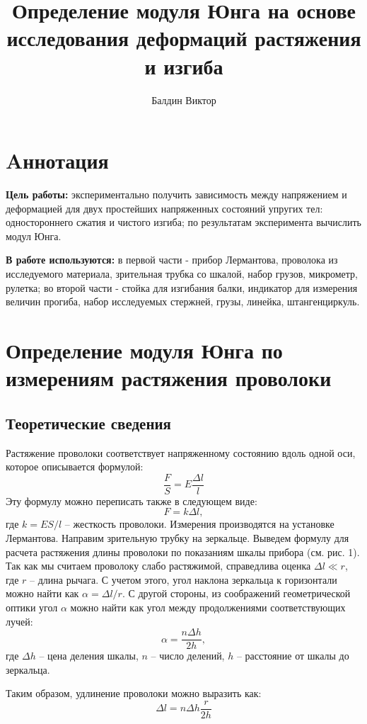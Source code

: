 \documentclass[12pt]{article}
\title{Определение модуля Юнга на основе исследования деформаций растяжения и изгиба}
\author{Балдин Виктор}
\begin{document}
    \maketitle

    \section{Aннотация}
    \par \textbf{Цель работы:} экспериментально получить зависимость между напряжением и деформацией
    для двух простейших напряженных состояний упругих тел: одностороннего сжатия и чистого изгиба;
    по результатам эксперимента вычислить модул Юнга.\\
    \par \textbf{В работе используются:} в первой части - прибор Лермантова, проволока
    из исследуемого материала,
     зрительная трубка со шкалой,
    набор грузов, микрометр, рулетка;  во второй части - стойка для изгибания балки, индикатор для
    измерения величин прогиба,
набор исследуемых стержней, грузы, линейка, штангенциркуль.

    \section{Определение модуля Юнга по измерениям растяжения проволоки}
    \subsection{Теоретические сведения}
    Растяжение проволоки соответствует напряженному состоянию вдоль одной оси, которое описывается формулой:
\begin{equation}
    \frac{F}{S} = E \frac{\Delta l}{l}
    \label{lermantov}
\end{equation}
    Эту формулу можно переписать также в следующем виде:
    \begin{equation}
        F = k\Delta l,
    \end{equation}
    где $k = ES / l$ -- жесткость проволоки.
    Измерения производятся на установке Лермантова.
    Направим зрительную трубку на зеркальце.
    Выведем формулу для расчета растяжения длины проволоки по показаниям шкалы
    прибора (см. рис. 1).
    Так как мы считаем проволоку слабо растяжимой, справедлива оценка $\Delta l \ll r$, где
    $r$ -- длина рычага. С учетом этого, угол наклона зеркальца к горизонтали можно
    найти как $\alpha = \Delta l/r$. С другой стороны, из соображений геометрической оптики
    угол $\alpha$ можно найти как угол между продолжениями соответствующих лучей:
    \begin{equation}
        \alpha = \frac{n\Delta h}{2h},
    \end{equation}
    где $\Delta h$ -- цена деления шкалы, $n$ -- число делений, $h$ -- расстояние от шкалы до
    зеркальца.
    \par Таким образом, удлинение проволоки можно выразить как:
    \begin{equation}
        \Delta l = n\Delta h\frac{r}{2h}
        \label{dlina}
    \end{equation}
\end{document}
